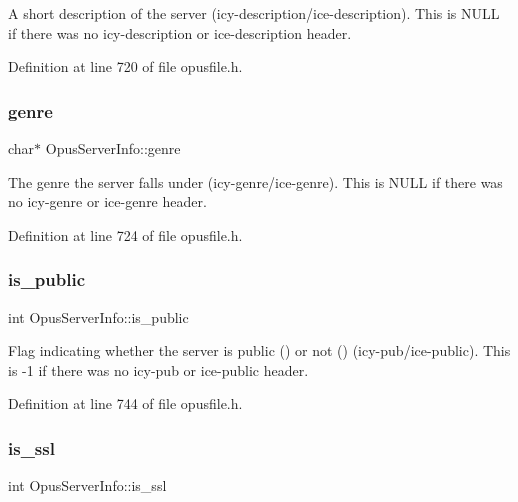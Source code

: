 A short description of the server (icy-\/description/ice-\/description). This is {\ttfamily N\+U\+LL} if there was no {\ttfamily icy-\/description} or {\ttfamily ice-\/description} header. 

Definition at line 720 of file opusfile.\+h.

\mbox{\label{struct_opus_server_info_a293431ddf20c3baa3a4751ad08f518bb}} 
\subsubsection{\texorpdfstring{genre}{genre}}
{\footnotesize\ttfamily char$\ast$ Opus\+Server\+Info\+::genre}

The genre the server falls under (icy-\/genre/ice-\/genre). This is {\ttfamily N\+U\+LL} if there was no {\ttfamily icy-\/genre} or {\ttfamily ice-\/genre} header. 

Definition at line 724 of file opusfile.\+h.

\mbox{\label{struct_opus_server_info_a9e81d2992f3009847c30bb4b0dc5c7de}} 
\subsubsection{\texorpdfstring{is\_public}{is\_public}}
{\footnotesize\ttfamily int Opus\+Server\+Info\+::is\+\_\+public}

Flag indicating whether the server is public ({}) or not ({}) (icy-\/pub/ice-\/public). This is {\ttfamily -\/1} if there was no {\ttfamily icy-\/pub} or {\ttfamily ice-\/public} header. 

Definition at line 744 of file opusfile.\+h.

\mbox{\label{struct_opus_server_info_a3bce31c0a77548625a4d8125251e9b11}} 
\subsubsection{\texorpdfstring{is\_ssl}{is\_ssl}}
{\footnotesize\ttfamily int Opus\+Server\+Info\+::is\+\_\+ssl}

